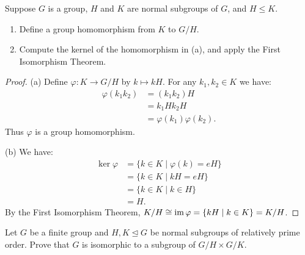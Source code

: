 \documentclass[10pt,twoside,openany]{memoir}
\begin{document}
\begin{problem}[F19, P4]
    Suppose $G$ is a group, $H$ and $K$ are normal subgroups of $G$, and $H \leq K$.
    \begin{enumerate}[label = (\alph*),itemsep=1pt,topsep=3pt]
        \item Define a group homomorphism from $K$ to $G/H$.
        \item Compute the kernel of the homomorphism in (a), and apply the First Isomorphism Theorem.
    \end{enumerate}
\end{problem}
        \begin{proof}
            (a) Define $\varphi:K \rightarrow G/H$ by $k \mapsto kH$. For any $k_1,k_2 \in K$ we have:
                \begin{equation*}
                \begin{split}
                    \varphi(k_1 k_2)
                    & = (k_1 k_2) H \\
                    & = k_1H k_2H \\
                    & = \varphi(k_1)\varphi(k_2).
                \end{split}
                \end{equation*}
            Thus $\varphi$ is a group homomorphism.

            (b) We have: 
                \begin{equation*}
                \begin{split}
                    \ker \varphi 
                    & = \{k \in K \mid \varphi(k) = eH \} \\
                    & = \{k \in K \mid kH = eH\} \\
                    & = \{k \in K \mid k \in H\} \\
                    & = H. 
                \end{split}
                \end{equation*}
            By the First Isomorphism Theorem, $K/H \cong \operatorname{im} \varphi = \{kH \mid k \in K\} = K/H$.
        \end{proof}
\begin{problem}
    Let $G$ be a finite group and $H,K \trianglelefteq G$ be normal subgroups of relatively prime order. Prove that $G$ is isomorphic to a subgroup of $G/H \times G/K$.
\end{problem}
\end{document}
